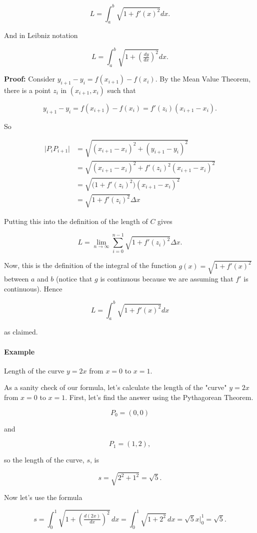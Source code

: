 $$L = \int_a^b \sqrt{1 + f'(x)^2} dx.$$

And in Leibniz notation

$$L = \int_a^b \sqrt{1 + \left(\tfrac{dy}{dx}\right)^2} dx.$$

\textbf{Proof:} Consider $y_{i+1} - y_i = f(x_{i+1}) - f(x_i)$. By the Mean Value Theorem, there is a point $z_i$ in $(x_{i+1}, x_i)$ such that

$$y_{i+1} - y_i = f(x_{i+1}) - f(x_i) = f'(z_i)(x_{i+1} - x_i).$$

So

\begin{align}
\bigl|P_i P_{i+1}\bigr| &= \sqrt{(x_{i+1} - x_i)^2 + (y_{i+1} - y_i)^2}\\
&= \sqrt{(x_{i+1} - x_i)^2 + f'(z_i)^2 (x_{i+1} - x_i)^2}\\
&= \sqrt{\bigl(1 + f'(z_i)^2\bigr)(x_{i+1} - x_i)^2}\\
&= \sqrt{1 + f'(z_i)^2} \Delta x
\end{align}

Putting this into the definition of the length of $C$ gives

$$L = \lim_{n \to \infty} \sum_{i=0}^{n-1} \sqrt{1 + f'(z_i)^2} \Delta x.$$

Now, this is the definition of the integral of the function $g(x) = \sqrt{1 + f'(x)^2}$ between $a$ and $b$ (notice that $g$ is continuous because we are assuming that $f'$ is continuous). Hence

$$L = \int_a^b \sqrt{1 + f'(x)^2} dx$$

as claimed.

\paragraph{Example}

Length of the curve $y = 2x$ from $x = 0$ to $x = 1$.

As a sanity check of our formula, let's calculate the length of the "curve" $y = 2x$ from $x = 0$ to $x = 1$. First, let's find the answer using the Pythagorean Theorem.

$$P_0 = (0,0)$$

and

$$P_1 = (1,2),$$

so the length of the curve, $s$, is

$$s = \sqrt{2^2 + 1^2} = \sqrt{5}.$$

Now let's use the formula

$$s = \int_0^1 \sqrt{1 + \left(\tfrac{d(2x)}{dx}\right)^2}\, dx = \int_0^1 \sqrt{1 + 2^2}\, dx = \sqrt{5} x \bigg|_0^1 = \sqrt{5}.$$

